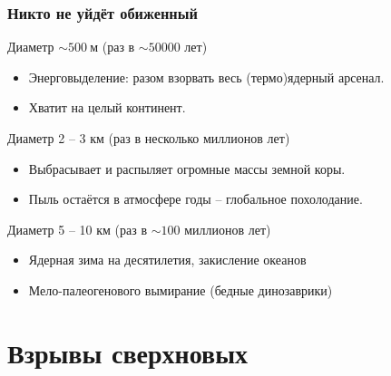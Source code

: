 \documentclass[aspectratio=169]{beamer}
\begin{document}
\begin{frame}
\frametitle{Никто не уйдёт обиженный}

\begin{block}{Диаметр $\sim 500 \: \mathrm{\text{м}}$ (раз в $\sim 50000$ лет)}
\begin{itemize}
\item Энерговыделение: разом взорвать весь (термо)ядерный арсенал.
\item Хватит на целый континент.
\end{itemize}
\end{block}

\begin{block}{Диаметр 2 -- 3 км (раз в несколько миллионов лет)}
\begin{itemize}
\item Выбрасывает и распыляет огромные массы земной коры.
\item Пыль остаётся в атмосфере годы -- глобальное похолодание.
\end{itemize}
\end{block}

\begin{block}{Диаметр 5 -- 10 км (раз в $\sim 100$ миллионов лет)}
\begin{itemize}
\item Ядерная зима на десятилетия, закисление океанов
\item Мело-палеогенового вымирание (бедные динозаврики)
\end{itemize}
\end{block}
\end{frame}

\section{Взрывы сверхновых}
\end{document}
